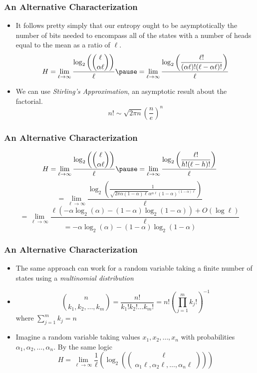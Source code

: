 \documentclass[xcolor=dvipsnames]{beamer}
\begin{document}
	\begin{frame}
	\frametitle{An Alternative Characterization}
    	\begin{itemize}
    	    \item It follows pretty simply that our entropy ought to be asymptotically the number of bits needed to encompass all of the states with a number of heads equal to the mean as a ratio of $\ell$.  $$ H = \lim_{\ell \to \infty}\frac{\displaystyle \log_2 \left({\ell \choose \alpha \ell}\right)}{\ell} \pause = \lim_{\ell \to \infty} \frac{\displaystyle \log_2\left(\frac{\ell!}{(\alpha \ell)!(\ell - \alpha \ell)!}\right)}{\ell}$$
    	    \pause
    	    \item We can use \textit{Stirling's Approximation}, an asymptotic result about the factorial. $$ n! \sim \sqrt{2\pi n} \left(\frac{n}{e}\right)^n$$
    	\end{itemize}
	\end{frame}
	
		\begin{frame}
	    \frametitle{An Alternative Characterization}
            $$H = \lim_{\ell \to \infty}\frac{\displaystyle \log_2 \left({\ell \choose \alpha \ell}\right)}{\ell} \pause = \lim_{\ell \to \infty} \frac{\displaystyle \log_2\left(\frac{\ell!}{h!(\ell - h)!}\right)}{\ell} $$
            \pause
	        \resizebox{.95\hsize}{!}{$$ = \lim \limits_{\ell \to \infty} \frac{ \displaystyle \log_2\left( \frac{\displaystyle \sqrt{2\pi \ell} \ell^\ell e^{-\ell}}{\displaystyle \left(\sqrt{2\pi \alpha\ell}(\alpha\ell)^{\alpha\ell} e^{-\alpha \ell}\right)\left(\sqrt{2\pi (1-\alpha)\ell}((1-\alpha)\ell)^{(1-\alpha)\ell} e^{-(1-\alpha)\ell}\right)}\right)}{\displaystyle \ell} $$}
	        \pause 
	        $$ =\lim_{\ell \to \infty} \frac{\displaystyle \log_2\left( \frac{1}{\sqrt{2\pi\alpha(1-\alpha)\ell} \alpha^{\alpha\ell}(1-\alpha)^{(1-\alpha)\ell}} \right)}{\ell}$$ 
	        \pause 
	         $$ = \lim_{\ell \to \infty} \frac{\ell \left(-\alpha \log_2(\alpha)-(1-\alpha)\log_2(1-\alpha)\right) + O(\log\ell)}{\ell}$$
	         \pause
	         $$ = \boxed{-\alpha \log_2(\alpha) -(1-\alpha)\log_2(1-\alpha)} $$
	\end{frame}
	
	\begin{frame}
	\frametitle{An Alternative Characterization}
	    \begin{itemize}
	        \item The same approach can work for a random variable taking a finite number of states using a \textit{multinomial distribution}
	        \pause
	        \item $$ {n \choose  k_1, k_2, \dots, k_m} = \frac{n!}{k_1!k_2! \dots k_m!} = n!\left(\prod_{j=1}^m k_j!\right)^{-1} $$
	        where $\sum \limits_{j=1}^m k_j = n$
	        \pause 
	        \item Imagine a random variable taking values $x_1, x_2, \dots, x_n$ with probabilities $\alpha_1, \alpha_2, \dots, \alpha_n$. By the same logic $$ H = \lim_{\ell \to \infty} \frac{1}{\ell}\left(\log_2\left({\ell \choose \alpha_1\ell, \alpha_2\ell, \dots, \alpha_n\ell} \right)\right) $$
	   \end{itemize}
	\end{frame}
	
\end{document}
